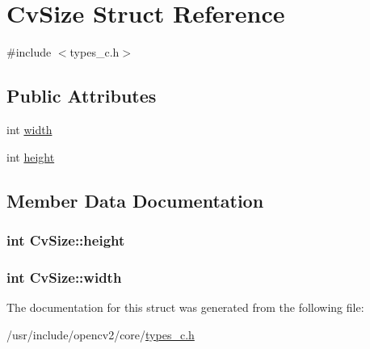 \hypertarget{structCvSize}{\section{Cv\-Size Struct Reference}
\label{structCvSize}
}


{\ttfamily \#include $<$types\-\_\-c.\-h$>$}

\subsection*{Public Attributes}
\begin{DoxyCompactItemize}
\item 
int \hyperlink{structCvSize_a2b1a1518e624c74c5a0e24c6cc1c3170}{width}
\item 
int \hyperlink{structCvSize_ac743399a59a7a2f302091b9180d23673}{height}
\end{DoxyCompactItemize}


\subsection{Member Data Documentation}
\hypertarget{structCvSize_ac743399a59a7a2f302091b9180d23673}{
\subsubsection[{height}]{\setlength{\rightskip}{0pt plus 5cm}int Cv\-Size\-::height}}\label{structCvSize_ac743399a59a7a2f302091b9180d23673}
\hypertarget{structCvSize_a2b1a1518e624c74c5a0e24c6cc1c3170}{
\subsubsection[{width}]{\setlength{\rightskip}{0pt plus 5cm}int Cv\-Size\-::width}}\label{structCvSize_a2b1a1518e624c74c5a0e24c6cc1c3170}


The documentation for this struct was generated from the following file\-:\begin{DoxyCompactItemize}
\item 
/usr/include/opencv2/core/\hyperlink{core_2types__c_8h}{types\-\_\-c.\-h}\end{DoxyCompactItemize}
